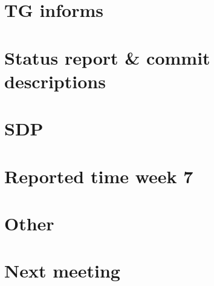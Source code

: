 \documentclass{article}
\begin{document}
\begin{flushleft}
\section{TG informs}
\section{Status report \& commit descriptions}
\section{SDP}
\section{Reported time week 7}
\section{Other}
\section{Next meeting}



\end{flushleft}
\end{document}
